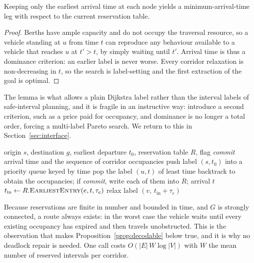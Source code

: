 \documentclass[manuscript,screen,review]{acmart}
\begin{document}
\begin{lemma}
\label{lem:label}
Keeping only the earliest arrival time at each node yields a
minimum-arrival-time leg with respect to the current reservation table.
\end{lemma}

\begin{proof}
Berths have ample capacity and do not occupy the traversal resource, so a
vehicle standing at $u$ from time $t$ can reproduce any behaviour available to
a vehicle that reaches $u$ at $t'>t$, by simply waiting until $t'$. Arrival
time is thus a dominance criterion: an earlier label is never worse. Every
corridor relaxation is non-decreasing in $t$, so the search is label-setting
and the first extraction of the goal is optimal.
\end{proof}

The lemma is what allows a plain Dijkstra label rather than the interval labels
of safe-interval planning, and it is fragile in an instructive way: introduce a
second criterion, such as a price paid for occupancy, and dominance is no
longer a total order, forcing a multi-label Pareto search. We return to this in
Section~\ref{sec:interface}.

\begin{algorithm}[t]
\caption{\textsc{Route}: conflict-free leg planning}
\label{alg:route}
\small
\begin{algorithmic}[1]
\Require origin $s$, destination $g$, earliest departure $t_0$, reservation
table $R$, flag \textit{commit}
\Ensure arrival time and the sequence of corridor occupancies
\State push label $(s,t_0)$ into a priority queue keyed by time
  \State pop the label $(u,t)$ of least time
   \State backtrack to obtain the occupancies; if \textit{commit},
       write each of them into $R$; \Return arrival $t$ \EndIf
    \State $t_{\text{in}} \gets R.\textsc{EarliestEntry}(e,t,\tau_e)$
    \State relax label $(v,\ t_{\text{in}}+\tau_e)$
  \EndFor
\EndWhile
\end{algorithmic}
\end{algorithm}

Because reservations are finite in number and bounded in time, and $G$ is
strongly connected, a route always exists: in the worst case the vehicle waits
until every existing occupancy has expired and then travels unobstructed. This
is the observation that makes Proposition~\ref{prop:decodable} below true, and
it is why no deadlock repair is needed. One call costs
$O(|E|\,W\log|V|)$ with $W$ the mean number of reserved intervals per corridor.
\end{document}
